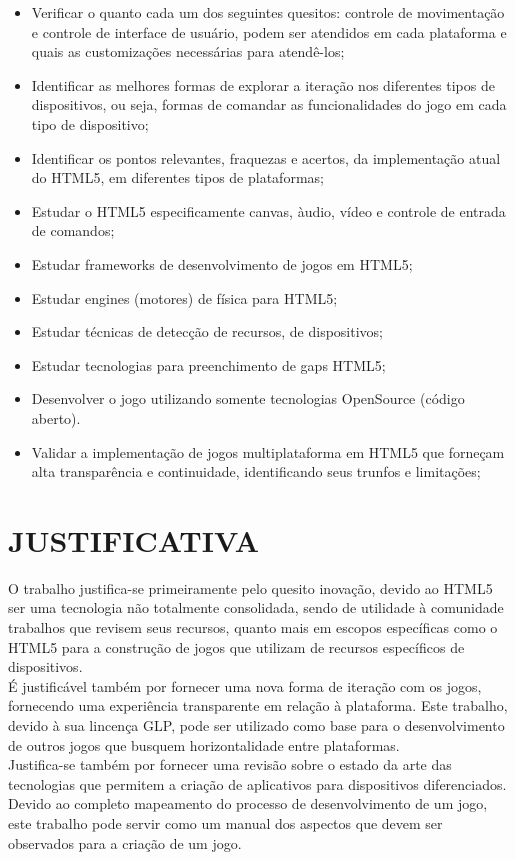 \documentclass{article}
\begin{document}
\begin{itemize}
    \item Verificar o quanto cada um dos seguintes quesitos: controle de movimentação e controle de interface de usuário, podem ser atendidos em cada plataforma e quais as customizações necessárias para atendê-los;
    \item Identificar as melhores formas de explorar a iteração nos diferentes tipos de dispositivos, ou seja, formas de comandar as funcionalidades do jogo em cada tipo de dispositivo;

    \item Identificar os pontos relevantes, fraquezas e acertos, da implementação atual do HTML5, em diferentes tipos de plataformas;

    \item Estudar o HTML5 especificamente canvas, àudio, vídeo e controle de entrada de comandos;

    \item Estudar frameworks de desenvolvimento de jogos em HTML5;

    \item Estudar engines (motores) de física para HTML5;

    \item Estudar técnicas de detecção de recursos, de dispositivos;

    \item Estudar tecnologias para preenchimento de gaps HTML5;

    \item Desenvolver o jogo utilizando somente tecnologias OpenSource (código aberto). 

    \item Validar a implementação de jogos multiplataforma em HTML5 que forneçam alta transparência e continuidade, identificando seus trunfos e limitações;

\end{itemize}

\section{JUSTIFICATIVA}

O trabalho justifica-se primeiramente pelo quesito inovação, devido ao HTML5 ser uma tecnologia não totalmente consolidada, sendo de utilidade à comunidade trabalhos que revisem seus recursos, quanto mais em escopos específicas como o HTML5 para a construção de jogos que utilizam de recursos específicos de dispositivos. 
\\
	É justificável também por fornecer uma nova forma de iteração com os jogos, fornecendo uma experiência transparente em relação à plataforma. Este trabalho, devido à sua lincença GLP, pode ser utilizado como base para o desenvolvimento de outros jogos que busquem horizontalidade entre plataformas. 
\\
	Justifica-se também por fornecer uma revisão sobre o estado da arte das tecnologias que permitem a criação de aplicativos para dispositivos diferenciados. Devido ao completo mapeamento do processo de desenvolvimento de um jogo, este trabalho pode servir como um manual dos aspectos que devem ser observados para a criação de um jogo.
\end{document}
